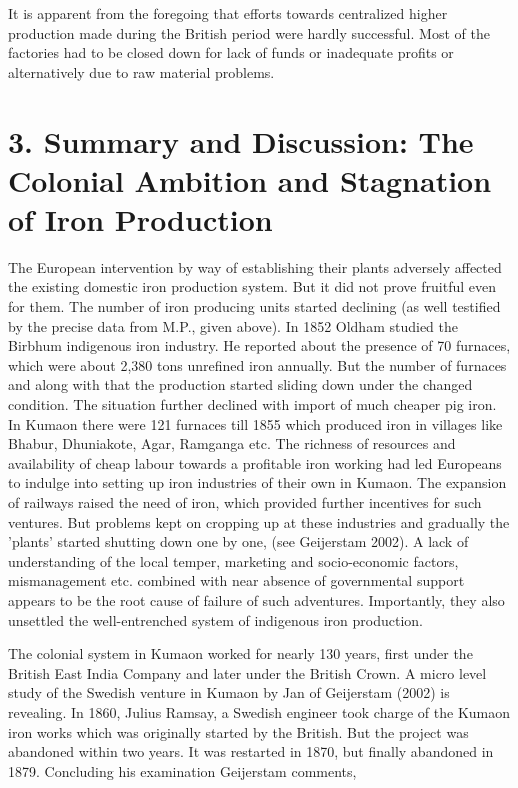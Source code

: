 It is apparent from the foregoing that efforts towards centralized higher production made during the British period were hardly successful.  Most of the factories had to be closed down for lack of funds or inadequate profits or alternatively due to raw material problems.

\section*{3. Summary and Discussion: The Colonial Ambition and Stagnation of Iron Production}

The European intervention by way of establishing their plants adversely affected the existing domestic iron production system. But it did not prove fruitful even for them.  The number of iron producing units started declining (as well testified by the precise data from M.P., given above).  In 1852 Oldham studied the Birbhum indigenous iron industry. He reported about the presence of 70 furnaces, which were about 2,380 tons unrefined iron annually.  But the number of furnaces and along with that the production started sliding down under the changed condition. The situation further declined with import of much cheaper pig iron. In Kumaon there were 121 furnaces till 1855 which produced iron in villages like Bhabur, Dhuniakote, Agar, Ramganga etc. The richness of resources and availability of cheap labour towards a profitable iron working had led Europeans to indulge into setting up iron industries of their own in Kumaon. The expansion of railways raised the need of iron, which provided further incentives for such ventures. But problems kept on cropping up at these industries and gradually the 'plants' started shutting down one by one, (see Geijerstam 2002). A lack of understanding of the local temper, marketing and socio-economic factors, mismanagement etc. combined with near absence of governmental support appears to be the root cause of failure of such adventures. Importantly, they also unsettled the well-entrenched system of indigenous iron production. 

The colonial system in Kumaon worked for nearly 130 years, first under the British East India Company and later under the British Crown. A micro level study of the Swedish venture in Kumaon by Jan of Geijerstam (2002) is revealing. In 1860, Julius Ramsay, a Swedish engineer took charge of the Kumaon iron works which was originally started by the British. But the project was abandoned within two years. It was restarted in 1870, but finally abandoned in 1879. Concluding his examination Geijerstam comments, 

